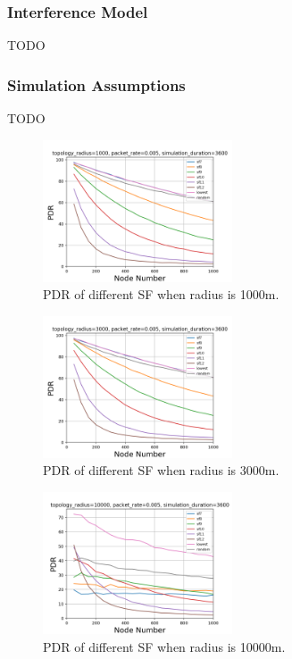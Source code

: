 \documentclass[conference]{IEEEtran}
\begin{document}
\subsubsection{Interference Model}
TODO

\subsubsection{Simulation Assumptions}
TODO

\begin{figure}
\centering
\includegraphics[width=0.5\textwidth]{sf_1000}
\caption{PDR of different SF when radius is 1000m.}
\label{fig:sf_1000}
\end{figure}

\begin{figure}
\centering
\includegraphics[width=0.5\textwidth]{sf_3000}
\caption{PDR of different SF when radius is 3000m.}
\label{fig:sf_3000}
\end{figure}

\begin{figure}
\centering
\includegraphics[width=0.5\textwidth]{sf_10000}
\caption{PDR of different SF when radius is 10000m.}
\label{fig:sf_10000}
\end{figure}
\end{document}
